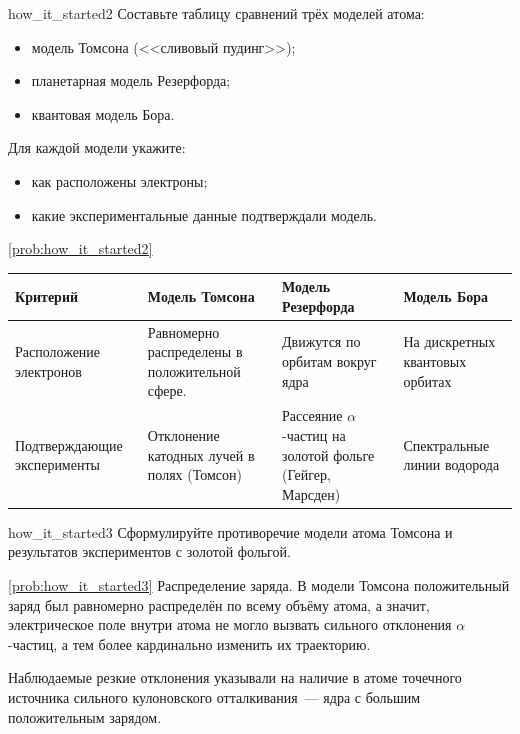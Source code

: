 \begin{problem}{}{how_it_started2}
    Составьте таблицу сравнений трёх моделей атома:
    \begin{itemize}
        \item модель Томсона (<<сливовый пудинг>>);
        \item планетарная модель Резерфорда;
        \item квантовая модель Бора.
    \end{itemize}

    Для каждой модели укажите:
    \begin{itemize}
        \item как расположены электроны;
        \item какие экспериментальные данные подтверждали модель.
    \end{itemize}

    \begin{sol}{\ref{prob:how_it_started2}}
        \begin{center}
            \small
            \begin{tabularx}{\textwidth}{
                >{\hsize}Y
                >{\hsize}Y
                >{\hsize}Y
                >{\hsize}Y
                }
                \hline
                Критерий & Модель Томсона & Модель Резерфорда & Модель Бора \\
                \hline
                Расположение электронов & Равномерно распределены в положительной сфере. & Движутся по орбитам вокруг ядра & На дискретных квантовых орбитах \\
                \hline
                Подтверждающие эксперименты & Отклонение катодных лучей в полях (Томсон) & Рассеяние $\alpha$-частиц на золотой фольге (Гейгер, Марсден) & Спектральные линии водорода \\
                \hline
            \end{tabularx}
        \end{center}
    \end{sol}
\end{problem}

\begin{problem}{}{how_it_started3}
    Сформулируйте противоречие модели атома Томсона и результатов экспериментов с золотой фольгой.

    \begin{sol}{\ref{prob:how_it_started3}}
        Распределение заряда. В модели Томсона положительный заряд был равномерно распределён по всему объёму атома, а значит, электрическое поле внутри атома не могло вызвать сильного отклонения $\alpha$-частиц, а тем более кардинально изменить их траекторию.

        Наблюдаемые резкие отклонения указывали на наличие в атоме точечного источника сильного кулоновского отталкивания~--- ядра с большим положительным зарядом.
    \end{sol}
\end{problem}

